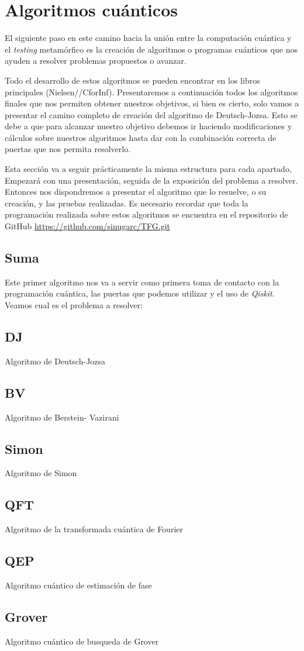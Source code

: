\cleardoublepage

\chapter{Algoritmos cuánticos}
\label{makereference}

El siguiente paso en este camino hacia la unión entre la computación cuántica y el \textit{testing} metamórfico es la creación de algoritmos o programas cuánticos que nos ayuden a resolver problemas propuestos o avanzar. \newline

Todo el desarrollo de estos algoritmos se pueden encontrar en los libros principales (Nielsen//CforInf). Presentaremos a continuación todos los algoritmos finales que nos permiten obtener nuestros objetivos, si bien es cierto, solo vamos a presentar el camino completo de creación del algoritmo de Deutsch-Jozsa. Esto se debe a que para alcanzar nuestro objetivo debemos ir haciendo modificaciones y cálculos sobre nuestros algoritmos hasta dar con la combinación correcta de puertas que nos permita resolverlo.\newline

Esta sección va a seguir prácticamente la misma estructura para cada apartado, Empezará con una presentación, seguida de la exposición del problema a resolver. Entonces nos dispondremos a presentar el algoritmo que lo resuelve, o su creación, y las pruebas realizadas. Es necesario recordar que toda la programación realizada sobre estos algoritmos se encuentra en el repositorio de GitHub \url{https://github.com/sinugarc/TFG.git}

\section{Suma}
 Este primer algoritmo nos va a servir como primera toma de contacto con la programación cuántica, las puertas que podemos utilizar y el uso de \textit{Qiskit}. Veamos cual es el problema a resolver:

\section{DJ}
 Algoritmo de Deutsch-Jozsa \n

\section{BV}
Algoritmo de Berstein- Vazirani \n

\section{Simon}
Algoritmo de Simon \n

\section{QFT}
Algoritmo de la transformada cuántica de Fourier \n

\section{QEP}
Algoritmo cuántico de estimación de fase \n

\section{Grover}
Algoritmo cuántico de busqueda de Grover \n